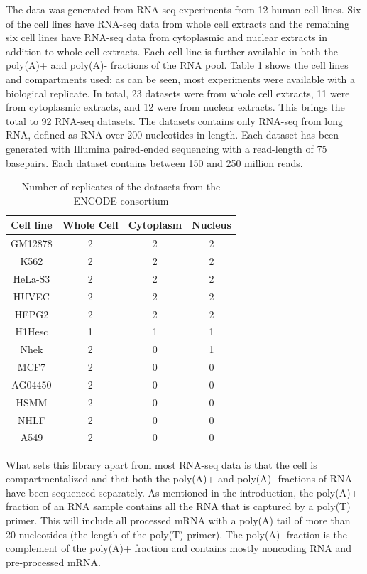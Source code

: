 The data was generated from RNA-seq experiments from 12 human cell lines. Six
of the cell lines have RNA-seq data from whole cell extracts and the remaining
six cell lines have RNA-seq data from cytoplasmic and nuclear extracts in
addition to whole cell extracts. Each cell line is further available in both the
poly(A)+ and poly(A)- fractions of the RNA pool. Table \ref{tab:Datasets} shows
the cell lines and compartments used; as can be seen, most experiments were
available with a biological replicate. In total, 23 datasets were from whole
cell extracts, 11 were from cytoplasmic extracts, and 12 were from nuclear
extracts. This brings the total to 92 RNA-seq datasets. The datasets contains
only RNA-seq from long RNA, defined as RNA over 200 nucleotides in length. Each
dataset has been generated with Illumina paired-ended sequencing with a
read-length of 75 basepairs. Each dataset contains between 150 and 250 million
reads.

\begin{table}
	\centering
	\begin{tabular}{cccc}
	  Cell line & Whole Cell & Cytoplasm & Nucleus \\
	  \midrule
	  GM12878 & 2 & 2 & 2 \\
	  K562 & 2 & 2 & 2 \\
	  HeLa-S3 & 2 & 2 & 2 \\
	  HUVEC & 2 & 2 & 2 \\
	  HEPG2 & 2 & 2 & 2 \\
	  H1Hesc & 1 & 1 & 1 \\
	  Nhek & 2 & 0 & 1 \\
	  MCF7 & 2 & 0 & 0 \\
	  AG04450 & 2 & 0 & 0 \\
	  HSMM & 2 & 0 & 0 \\
	  NHLF & 2 & 0 & 0 \\
	  A549 & 2 & 0 & 0 \\
	\end{tabular}
	\caption{Number of replicates of the datasets from the ENCODE consortium}
	\label{tab:Datasets}
\end{table}

What sets this library apart from most RNA-seq data is that the cell is
compartmentalized and that both the poly(A)+ and poly(A)- fractions of RNA have
been sequenced separately. As mentioned in the introduction, the poly(A)+
fraction of an RNA sample contains all the RNA that is captured by a poly(T)
primer. This will include all processed mRNA with a poly(A) tail of more than
20 nucleotides (the length of the poly(T) primer). The poly(A)- fraction is the
complement of the poly(A)+ fraction and contains mostly noncoding RNA and
pre-processed mRNA.

